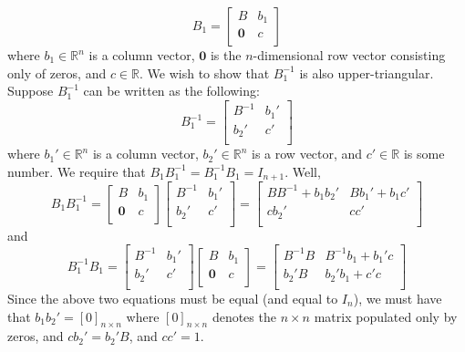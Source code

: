 \documentclass{article}
\begin{document}
\[B_1 = 
\begin{bmatrix}
    B & b_1\\
    \bm{0} & c\\
\end{bmatrix}\]
where $b_1 \in \mathbb{R}^n$ is a column vector, $\bm{0}$ is the $n$-dimensional row vector consisting only of zeros, and $c \in \mathbb{R}$. We wish to show that $B_1^{-1}$ is also upper-triangular. Suppose $B_1^{-1}$ can be written as the following:
\begin{equation}
B_1^{-1} = 
\begin{bmatrix}
    B^{-1} & b_{1}'\\
    b_{2}' & c'\\
\end{bmatrix}
\end{equation}
where $b_1' \in \mathbb{R}^n$ is a column vector, $b_2' \in \mathbb{R}^n$ is a row vector, and $c' \in \mathbb{R}$ is some number. We require that $B_1B_1^{-1} = B_1^{-1}B_1 = I_{n+1}$. Well,
\[B_1B_1^{-1} = 
\begin{bmatrix}
    B & b_1\\
    \bm{0} & c\\
\end{bmatrix}
\begin{bmatrix}
    B^{-1} & b_{1}'\\
    b_{2}' & c'\\
\end{bmatrix}
    =
\begin{bmatrix}
    BB^{-1} + b_1b_2' & Bb_1' + b_1c'\\
    cb_2' & cc'\\
\end{bmatrix}
\]
and
\[B_1^{-1}B_1 = 
\begin{bmatrix}
    B^{-1} & b_{1}'\\
    b_{2}' & c'\\
\end{bmatrix}
\begin{bmatrix}
    B & b_1\\
    \bm{0} & c\\
\end{bmatrix}
= 
\begin{bmatrix}
    B^{-1}B & B^{-1}b_1 + b_1'c\\
    b_2'B & b_2'b_1 + c'c\\
\end{bmatrix}
\]
Since the above two equations must be equal (and equal to $I_n$), we must have that $b_1b_2' = [0]_{n \times n}$ where $[0]_{n \times n}$ denotes the $n \times n$ matrix populated only by zeros, and $cb_2' = b_2'B$, and $cc' = 1$. 
\newline
\end{document}
